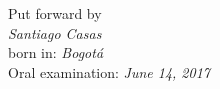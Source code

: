 \documentclass[
11pt, %
german, english,%
singlespacing, %
headsepline, %
]{MastersDoctoralThesis} %
\begin{document}
\begin{titlepage}
\begin{center}
		Put forward by\\[0.2cm]
			\textit{Santiago Casas}\\[0.2cm]
			born in: \textit{Bogotá} \\[0.2cm]
			Oral examination: \textit{June 14, 2017}
		
		\vfill
	\end{center}
\end{titlepage}


\end{document}

